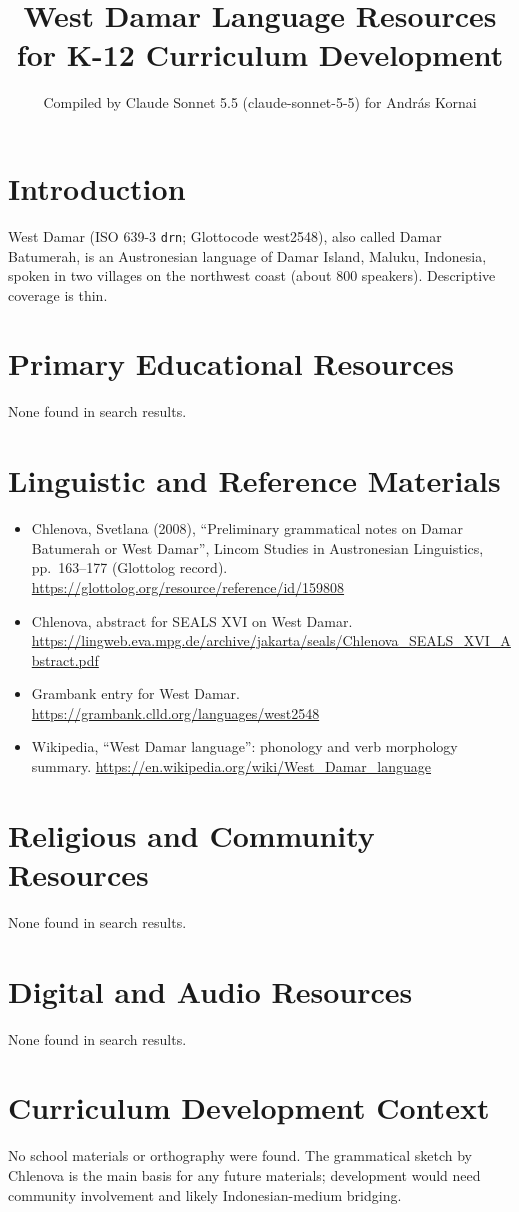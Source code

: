 \documentclass[12pt]{article}
\title{West Damar Language Resources for K-12 Curriculum Development}
\author{Compiled by Claude Sonnet 5.5 (claude-sonnet-5-5) for Andr\'as Kornai}
\date{}
\begin{document}
\maketitle
\section{Introduction}
West Damar (ISO 639-3 \texttt{drn}; Glottocode west2548), also called Damar Batumerah, is an Austronesian language of Damar Island, Maluku, Indonesia, spoken in two villages on the northwest coast (about 800 speakers). Descriptive coverage is thin.
\section{Primary Educational Resources}
None found in search results.
\section{Linguistic and Reference Materials}
\begin{itemize}
\item Chlenova, Svetlana (2008), ``Preliminary grammatical notes on Damar Batumerah or West Damar'', Lincom Studies in Austronesian Linguistics, pp.\ 163--177 (Glottolog record). \url{https://glottolog.org/resource/reference/id/159808}
\item Chlenova, abstract for SEALS XVI on West Damar. \url{https://lingweb.eva.mpg.de/archive/jakarta/seals/Chlenova_SEALS_XVI_Abstract.pdf}
\item Grambank entry for West Damar. \url{https://grambank.clld.org/languages/west2548}
\item Wikipedia, ``West Damar language'': phonology and verb morphology summary. \url{https://en.wikipedia.org/wiki/West_Damar_language}
\end{itemize}
\section{Religious and Community Resources}
None found in search results.
\section{Digital and Audio Resources}
None found in search results.
\section{Curriculum Development Context}
No school materials or orthography were found. The grammatical sketch by Chlenova is the main basis for any future materials; development would need community involvement and likely Indonesian-medium bridging.
\end{document}
